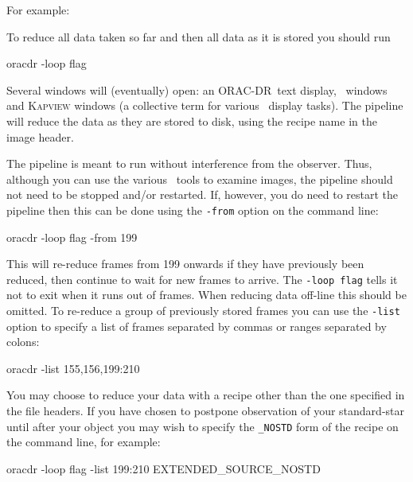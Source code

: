 \documentclass[twoside,11pt,nolof]{starlink}
\providecommand{\GAIA}{\xref{{\sc{Gaia}}}{sun214}{}}
\providecommand{\KAPPA}{\xref{{\sc{Kappa}}}{sun95}{}}
\providecommand{\ORACDR}{{\footnotesize ORAC-DR}}
\begin{document}
For example:

\begin{terminalv}
\end{terminalv}


To reduce all data taken so far and then all data as it is stored you
should run

\begin{terminalv}
      oracdr -loop flag
\end{terminalv}

Several windows will (eventually) open: an \ORACDR\ text display, \GAIA\
windows and \textsc{Kapview} windows (a collective term for various
\KAPPA\ display tasks). The pipeline will reduce the data as they
are stored to disk, using the recipe name in the image header.

The pipeline is meant to run without interference from the observer.
Thus, although you can use the various \GAIA\ tools to examine images,
the pipeline should not need to be stopped and/or restarted. If,
however, you do need to restart the pipeline then this can be done
using the \texttt{-from} option on the command line:

\begin{terminalv}
      oracdr -loop flag -from 199
\end{terminalv}

This will re-reduce frames from 199 onwards if they have previously
been reduced, then continue to wait for new frames to arrive. The \texttt{-loop flag} tells it not to exit when it runs out of frames. When
reducing data off-line this should be omitted. To re-reduce a group of
previously stored frames you can use the \texttt{-list} option to specify
a list of frames separated by commas or ranges separated by colons:

\begin{terminalv}
      oracdr -list 155,156,199:210
\end{terminalv}

You may choose to reduce your data with a recipe other than the one
specified in the file headers. If you have chosen to postpone
observation of your standard-star until after your object you may wish
to specify the \texttt{\_NOSTD} form of the recipe on the command line,
for example:

\begin{terminalv}
      oracdr -loop flag -list 199:210 EXTENDED_SOURCE_NOSTD
\end{terminalv}
\end{document}
